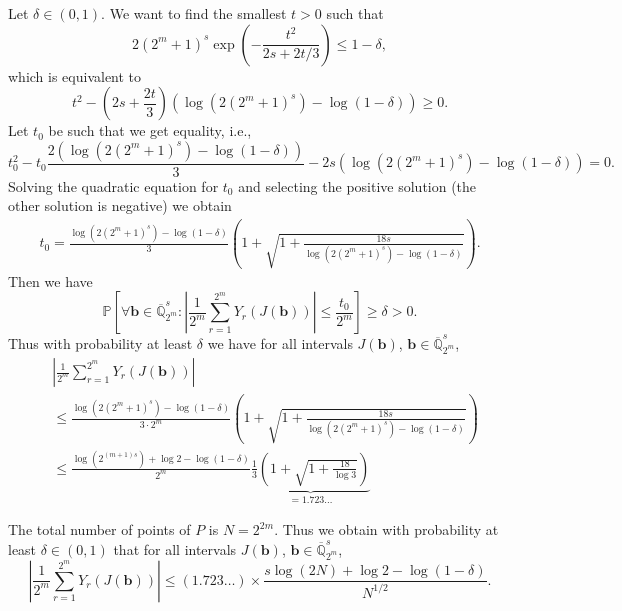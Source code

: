 \documentclass[12pt]{article}
\theoremstyle{definition}
\numberwithin{equation}{section}
\begin{document}
Let $\delta \in (0, 1)$. We want to find the smallest $t > 0$ such that
\begin{equation*}
2 (2^m+1)^s \exp \left( - \frac{t^2}{2s + 2 t/3}   \right) \le 1-\delta,
\end{equation*}
which is equivalent to
\begin{equation*}
t^2 - \left(2s + \frac{2 t}{3}\right)  (\log(2 (2^m+1)^s) - \log(1-\delta))  \ge 0.
\end{equation*}
Let $t_0$ be such that we get equality, i.e.,  
\begin{equation*}
t_0^2 -  t_0 \frac{2 (\log(2 (2^m+1)^s) - \log(1-\delta)) }{3}  -  2 s  ( \log(2 (2^m+1)^s) - \log(1-\delta) ) =  0.
\end{equation*}
Solving the quadratic equation for $t_0$ and selecting the positive solution (the other solution is negative) we obtain
\begin{align*}
t_0  = \frac{\log(2 (2^m+1)^s) - \log(1-\delta)}{3} \left(1 + \sqrt{1 +  \frac{ 18 s }{\log(2 (2^m+1)^s) - \log(1-\delta) }}  \right).
\end{align*}
Then we have
\begin{equation*}
\mathbb{P}\left[ \forall \bm{b} \in \overline{\mathbb{Q}}_{2^m}^s : \left| \frac{1}{2^m} \sum_{r=1}^{2^m} Y_r(J(\bm{b})) \right| \le \frac{t_0 }{2^m} \right] \ge \delta>0.
\end{equation*}
Thus with probability at least $\delta$ we have for all intervals $J(\bm{b})$, $\bm{b} \in \overline{\mathbb{Q}}_{2^m}^s$, 
\begin{align}
& \left| \frac{1}{2^m}  \sum_{r=1}^{2^m} Y_r(J(\bm{b})) \right| \nonumber \\ & \le \frac{\log(2 (2^m+1)^s) - \log(1-\delta)}{3 \cdot 2^m} \left(1   + \sqrt{1 + \frac{18 s}{\log(2 (2^m+1)^s) - \log(1-\delta) } } \right) \nonumber \\
& \le \frac{\log(2^{(m+1)s})+\log 2 - \log(1-\delta)}{2^m} \underbrace{\frac{1}{3}\left(1   + \sqrt{1 + \frac{18}{\log 3} } \right)}_{=1.723\ldots} \label{Yr_var_bound2}
\end{align}


The total number of points of $P$ is $N = 2^{2m}$. Thus we obtain with probability at least $\delta \in (0,1)$ that for all intervals $J(\bm{b})$, $\bm{b} \in \overline{\mathbb{Q}}_{2^m}^s$,
\begin{equation}\label{bound_ave_Yr}
\left| \frac{1}{2^m} \sum_{r=1}^{2^m} Y_r(J(\bm{b})) \right| \le (1.723\ldots) \times  \frac{s \log(2 N) + \log 2 - \log(1-\delta)}{N^{1/2}}.
\end{equation}
\end{document}
